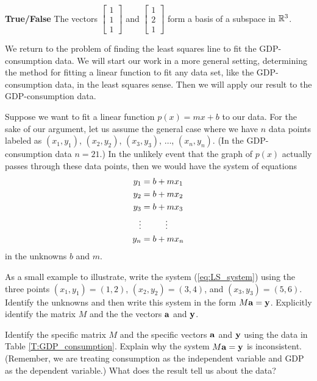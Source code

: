 \item \textbf{True/False} The vectors $\left[ \begin{array}{c} 1\\1\\1 \end{array} \right]$ and $\left[ \begin{array}{c} 1\\2\\1 \end{array} \right]$ form a basis of a subspace in $\mathbb{R}^3$.

\ea
\ee

\label{sec:proj_ls_approx}

We return to the problem of finding the least squares line to fit the GDP-consumption data. We will start our work in a more general setting, determining the  method for fitting a linear function to fit any data set, like the GDP-consumption data, in the least squares sense. Then we will apply our result to the GDP-consumption data. 

\begin{pactivity} \label{act:ls_no_line} Suppose we want to fit a linear function $p(x) = mx+b$ to our data. For the sake of our argument, let us assume the general case where we have $n$ data points labeled as $(x_1,y_1)$, $(x_2, y_2)$, $(x_3, y_3)$,  $\ldots$, $(x_n, y_n)$. (In the GDP-consumption data $n = 21$.) In the unlikely event that the graph of $p(x)$ actually passes through these data points, then we would have the system of equations
\begin{align}
y_1 &= b + mx_1  \notag  \\
y_2 &= b + mx_2 \notag  \\
y_3 &= b + mx_3 \label{eq:LS_system} \\
\vdots &\hspace{0.39in} \vdots  \notag\\
y_n &= b + mx_n \notag
\end{align}
in the unknowns $b$ and $m$. 
	\ba
	\item As a small example to illustrate, write the system (\ref{eq:LS_system}) using the three points $(x_1,y_1)= (1,2)$, $(x_2,y_2) = (3,4)$, and $(x_3,y_3) = (5,6)$. Identify the unknowns and then write this system in the form $M \mathbf{a} = \mathbf{y}$. Explicitly identify the matrix $M$ and the the vectors $\mathbf{a}$ and $\mathbf{y}$.
	
	\item Identify the specific matrix $M$ and the specific vectors $\mathbf{a}$ and $\mathbf{y}$ using the data in Table \ref{T:GDP_consumption}.  Explain why the system $M \mathbf{a} = \mathbf{y}$ is inconsistent. (Remember, we are treating consumption as the independent variable and GDP as the dependent variable.) What does the result tell us about the data? 

	
	\ea

\end{pactivity}


